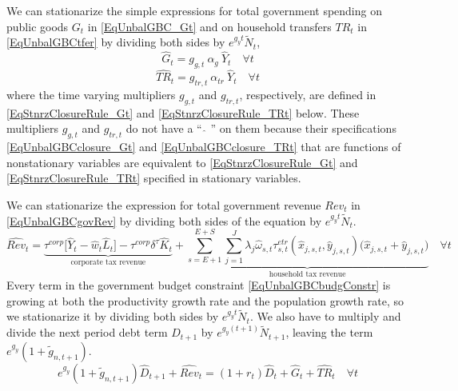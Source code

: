   We can stationarize the simple expressions for total government spending on public goods $G_t$ in \eqref{EqUnbalGBC_Gt} and on household transfers $TR_t$ in \eqref{EqUnbalGBCtfer} by dividing both sides by $e^{g_y t}\tilde{N}_t$,
  \begin{equation}\label{EqStnrz_Gt}
    \hat{G}_t = g_{g,t}\:\alpha_{g}\:\hat{Y}_t \quad\forall t
  \end{equation}
  \begin{equation}\label{EqStnrzTfer}
    \hat{TR}_t = g_{tr,t}\:\alpha_{tr}\:\hat{Y}_t \quad\forall t
  \end{equation}
  where the time varying multipliers $g_{g,t}$ and $g_{tr,t}$, respectively, are defined in \eqref{EqStnrzClosureRule_Gt} and \eqref{EqStnrzClosureRule_TRt} below. These multipliers $g_{g,t}$ and $g_{tr,t}$ do not have a ``$\:\,\hat{}\,\:$'' on them because their specifications \eqref{EqUnbalGBCclosure_Gt} and \eqref{EqUnbalGBCclosure_TRt} that are functions of nonstationary variables are equivalent to \eqref{EqStnrzClosureRule_Gt} and \eqref{EqStnrzClosureRule_TRt} specified in stationary variables.

  We can stationarize the expression for total government revenue $Rev_t$ in \eqref{EqUnbalGBCgovRev} by dividing both sides of the equation by $e^{g_y t}\tilde{N}_t$.
  \begin{equation}\label{EqStnrzGovRev}
    \hat{Rev}_t = \underbrace{\tau^{corp}\bigl[\hat{Y}_t - \hat{w}_t\hat{L}_t\bigr] - \tau^{corp}\delta^\tau \hat{K}_t}_{\text{corporate tax revenue}} + \underbrace{\sum_{s=E+1}^{E+S}\sum_{j=1}^J\lambda_j\hat{\omega}_{s,t}\tau^{etr}_{s,t}\left(\hat{x}_{j,s,t},\hat{y}_{j,s,t}\right)\bigl(\hat{x}_{j,s,t} + \hat{y}_{j,s,t}\bigr)}_{\text{household tax revenue}} \quad\forall t
  \end{equation}
  Every term in the government budget constraint \eqref{EqUnbalGBCbudgConstr} is growing at both the productivity growth rate and the population growth rate, so we stationarize it by dividing both sides by $e^{g_y t}\tilde{N}_t$. We also have to multiply and divide the next period debt term $D_{t+1}$ by $e^{g_y(t+1)}\tilde{N}_{t+1}$, leaving the term $e^{g_y}(1 + \tilde{g}_{n,t+1})$.
  \begin{equation}\label{EqStnrzGovBC}
    e^{g_y}\left(1 + \tilde{g}_{n,t+1}\right)\hat{D}_{t+1} + \hat{Rev}_t = (1 + r_t)\hat{D}_t + \hat{G}_t + \hat{TR}_t \quad\forall t
  \end{equation}

